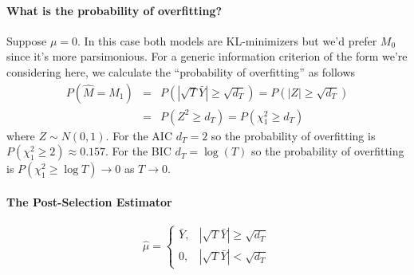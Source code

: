 \documentclass[12pt]{article}
\theoremstyle{definition}
\begin{document}

\paragraph{What is the probability of overfitting?} Suppose $\mu = 0$. In this case both models are KL-minimizers but we'd prefer $M_0$ since it's more parsimonious. For a generic information criterion of the form we're considering here, we calculate the ``probability of overfitting'' as follows
\begin{eqnarray*}
	P\left(\widehat{M} = M_1\right) &=& P\left(|\sqrt{T}\bar{Y}|\geq \sqrt{d_T}\right) = P(|Z|\geq \sqrt{d_T})\\
	 &=& P(Z^2 \geq d_T) = P(\chi^2_1 \geq d_T)
\end{eqnarray*}
where $Z \sim N(0,1)$. For the AIC $d_T = 2$ so the probability of overfitting is $P(\chi^2_1 \geq 2)\approx 0.157$. For the BIC $d_T = \log(T)$ so the probability of overfitting is $P(\chi^2_1 \geq \log T) \rightarrow 0$ as $T\rightarrow 0$.

\paragraph{The Post-Selection Estimator}

	$$\widehat{\mu}=\left\{\begin{array}
		{cc} \bar{Y}, & |\sqrt{T}\bar{Y} | \geq \sqrt{d_T} \\
		0, & |\sqrt{T}\bar{Y} | < \sqrt{d_T}
		\end{array}\right.$$
\end{document}

